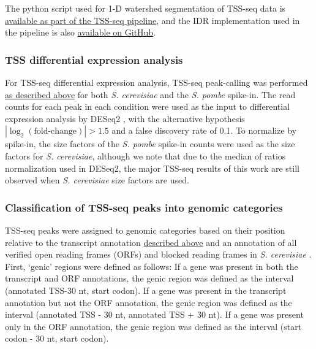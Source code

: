 The python script used for 1-D watershed segmentation of TSS-seq data is \href{https://github.com/winston-lab/tss-seq/blob/master/scripts/tss_peakcalling.py}{available as part of the TSS-seq pipeline}, and the IDR implementation used in the pipeline is also \href{https://github.com/nboley/idr}{available on GitHub}.

\subsubsection{TSS differential expression analysis}
\label{subsubsec:tss_differential_expression}

For TSS-seq differential expression analysis, TSS-seq peak-calling was performed \hyperref[subsubsec:tss_peak_calling]{as described above} for both \textit{S. cerevisiae} and the \textit{S. pombe} spike-in.
The read counts for each peak in each condition were used as the input to differential expression analysis by DESeq2 \citep{love2014}, with the alternative hypothesis $\allowbreak \left\lvert\log_2 \left(\text{fold-change}\right) \right\rvert > 1.5$ and a false discovery rate of 0.1.
To normalize by spike-in, the size factors of the \textit{S. pombe} spike-in counts were used as the size factors for \textit{S. cerevisiae}, although we note that due to the median of ratios normalization used in DESeq2, the major TSS-seq results of this work are still observed when \textit{S. cerevisiae} size factors are used.

\subsubsection[Classification of TSS-seq peaks\\ into genomic categories]{Classification of TSS-seq peaks into genomic categories}
\label{subsubsec:tss_peak_classification}

TSS-seq peaks were assigned to genomic categories based on their position relative to the transcript annotation \hyperref[subsubsec:tss_reannotation]{described above} and an annotation of all verified open reading frames (ORFs) and blocked reading frames in \textit{S. cerevisiae} \citep{engel2014}.
First, `genic' regions were defined as follows: If a gene was present in both the transcript and ORF annotations, the genic region was defined as the interval (annotated TSS-30 nt, start codon).
If a gene was present in the transcript annotation but not the ORF annotation, the genic region was defined as the interval (annotated TSS - 30 nt, annotated TSS + 30 nt).
If a gene was present only in the ORF annotation, the genic region was defined as the interval (start codon - 30 nt, start codon).

